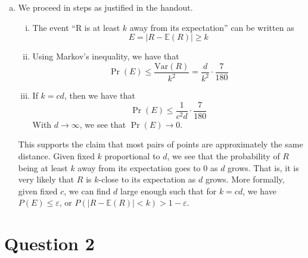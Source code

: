 \documentclass{article}
\renewcommand{\epsilon}{\varepsilon}
\begin{document}
\begin{enumerate}[(a)]
    \item We proceed in steps as justified in the handout. 
    \begin{enumerate}[i. ]
        \item The event ``R is at least $k$ away from its expectation'' can be written as \[E = |R - \mathbb{E}(R)| \geq k\]
        \item Using Markov's inequality, we have that \[\Pr(E) \leq \frac{\text{Var}(R)}{k^2} = \frac{d}{k^2} \cdot \frac{7}{180}\]
        \item If $k = cd$, then we have that \[\Pr(E) \leq \frac{1}{c^2 d} \cdot \frac{7}{180}\]
        With $d \to \infty$, we see that $\Pr(E) \to 0$.
    \end{enumerate}

    This supports the claim that most pairs of points are approximately the same distance. Given fixed $k$ proportional to $d$, we see that the probability of $R$ being at least $k$ away from its expectation goes to 0 as $d$ grows. That is, it is very likely that $R$ is $k$-close to its expectation as $d$ grows. More formally, given fixed $c$, we can find $d$ large enough such that for $k = cd$, we have $P(E) \leq \epsilon$, or $P(|R - \mathbb{E}(R)| < k) >  1 - \epsilon$.
\end{enumerate}

\newpage
\section*{Question 2}
\end{document}
